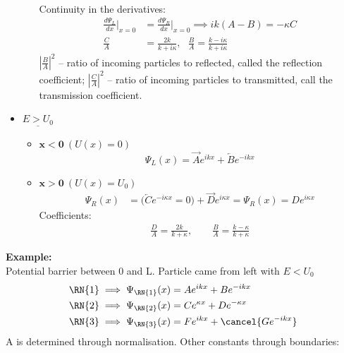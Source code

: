 \documentclass[a4paper, 11pt, normalem]{report}
\begin{document}
\begin{itemize}
\begin{itemize}
\begin{align}
                \end{align}
                Continuity in the derivatives:
                \begin{align}
                    \frac{d\Psi_{L}}{dx}\Big|_{x = 0} &= \frac{d\Psi_{R}}{dx}\Big|_{x = 0} \implies ik(A - B) = -\kappa C \\
                    \frac{C}{A} &= \frac{2k}{k + i\kappa},~~~\frac{B}{A} = \frac{k - i\kappa}{k + i\kappa}
                \end{align}
                $|\frac{B}{A}|^{2}$ -- ratio of incoming particles to reflected, called the reflection coefficient; $|\frac{C}{A}|^{2}$ -- ratio of incoming particles to transmitted, call the transmission coefficient.
        \end{itemize}
    \item $\underline{E > U_{0}}$
        \begin{itemize}
            \item $\mathbf{x < 0}~(U(x) = 0)$
                \begin{equation}
                    \Psi_{L}(x) = \overrightarrow{A}e^{ikx} + \overleftarrow{B}e^{-ikx}
                \end{equation}
            \item $\mathbf{x > 0}~(U(x) = U_{0})$
                \begin{align}
                    \Psi_{R}(x) &= \big(\overleftarrow{C}e^{-i\kappa x} = 0\big) + \overrightarrow{D}e^{i\kappa x} = \Psi_{R}(x) = De^{i\kappa x}
                \end{align}
                Coefficients:
                \begin{align}
                    \frac{D}{A} = \frac{2k}{k + \kappa},\qquad \frac{B}{A} = \frac{k - \kappa}{k + \kappa}
                \end{align}
        \end{itemize}
\end{itemize}
\textbf{Example:} \\
Potential barrier between 0 and L.
Particle came from left with $E < U_{0}$
\begin{align}
    \RN{1} &\implies \Psi_{\RN{1}}(x) = Ae^{ikx} + Be^{-ikx} \\
    \RN{2} &\implies \Psi_{\RN{2}}(x) = Ce^{\kappa x} + De^{-\kappa x} \\
    \RN{3} &\implies \Psi_{\RN{3}}(x) = Fe^{ikx} + \cancel{Ge^{-ikx}}
\end{align}
A is determined through normalisation.
Other constants through boundaries:
\end{document}
